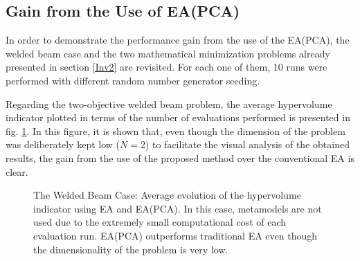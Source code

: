 
\subsection{Gain from the Use of EA(PCA)}

In order to demonstrate the performance gain from the use of the EA(PCA), the welded beam case and the two mathematical minimization problems already presented in section \ref{Inv2} are revisited. For each one of them, 10 runs were performed with different random number generator seeding. 

Regarding the two-objective welded beam problem, the average hypervolume indicator plotted in terms of the number of evaluations performed is presented in fig. \ref{HypervolumeComparison}. In this figure, it is shown that, even though the dimension of the problem was deliberately kept low ($N\!=\!2$) to facilitate the visual analysis of the obtained results, the gain from the use of the proposed method over the conventional EA is clear.  

\begin{figure}[h!]
\begin{minipage}[b]{1\linewidth}
 \centering
\end{minipage}
\caption{The Welded Beam Case: Average evolution of the hypervolume indicator using EA and EA(PCA). In this case, metamodels are not used due to the extremely small computational cost of each evaluation run. EA(PCA) outperforms traditional EA even though the dimensionality of the problem is very low.} 
\label{HypervolumeComparison}
\end{figure}



